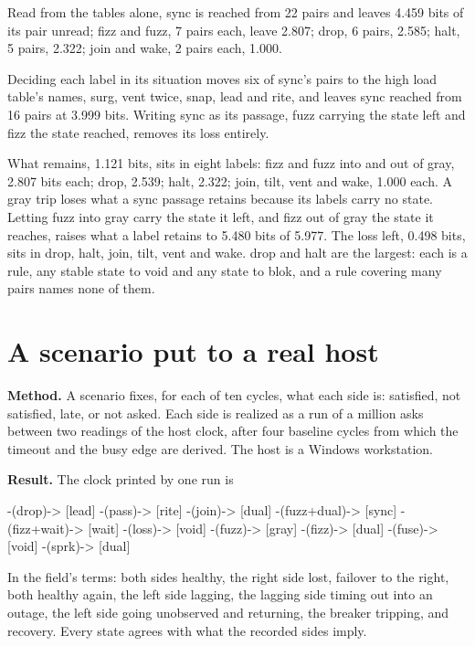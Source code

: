Read from the tables alone, sync is reached from 22 pairs and leaves 4.459 bits of its pair
unread; fizz and fuzz, 7 pairs each, leave 2.807; drop, 6 pairs, 2.585; halt, 5 pairs, 2.322; join
and wake, 2 pairs each, 1.000.

Deciding each label in its situation moves six of sync's pairs to the high load table's names,
surg, vent twice, snap, lead and rite, and leaves sync reached from 16 pairs at 3.999 bits.
Writing sync as its passage, fuzz carrying the state left and fizz the state reached, removes its
loss entirely.

What remains, 1.121 bits, sits in eight labels: fizz and fuzz into and out of gray, 2.807 bits
each; drop, 2.539; halt, 2.322; join, tilt, vent and wake, 1.000 each. A gray trip loses what a
sync passage retains because its labels carry no state. Letting fuzz into gray carry the state it
left, and fizz out of gray the state it reaches, raises what a label retains to 5.480 bits of
5.977. The loss left, 0.498 bits, sits in drop, halt, join, tilt, vent and wake. drop and halt
are the largest: each is a rule, any stable state to void and any state to blok, and a rule
covering many pairs names none of them.

\section{A scenario put to a real host}
\label{sec:scenario}

\textbf{Method.} A scenario fixes, for each of ten cycles, what each side is: satisfied, not satisfied,
late, or not asked. Each side is realized as a run of a million asks between two readings of the
host clock, after four baseline cycles from which the timeout and the busy edge are derived. The
host is a Windows workstation.

\textbf{Result.} The clock printed by one run is
\begin{flushleft}\small\ttfamily
[dual] -(drop)-> [lead] -(pass)-> [rite] -(join)-> [dual] -(fuzz+dual)-> [sync] -(fizz+wait)->
[wait] -(loss)-> [void] -(fuzz)-> [gray] -(fizz)-> [dual] -(fuse)-> [void] -(sprk)-> [dual]
\end{flushleft}
In the field's terms: both sides healthy, the right side lost, failover to the right, both healthy
again, the left side lagging, the lagging side timing out into an outage, the left side going
unobserved and returning, the breaker tripping, and recovery. Every state agrees with what the
recorded sides imply.

